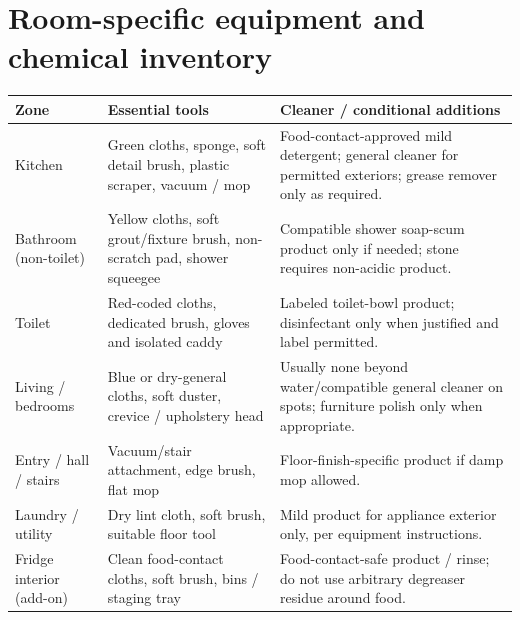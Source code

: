 \documentclass[10pt,letterpaper,oneside]{article}
\newcommand{\smalltable}{\par\small\renewcommand{\arraystretch}{1.24}}
\newcommand{\restorenormalfonttable}{\par\normalsize\renewcommand{\arraystretch}{1}}
\begin{document}
\section{Room-specific equipment and chemical inventory}
\smalltable\begin{longtable}{p{.18\linewidth}p{.37\linewidth}p{.36\linewidth}}\toprule
Zone & Essential tools & Cleaner / conditional additions\\\midrule\endhead
Kitchen & Green cloths, sponge, soft detail brush, plastic scraper, vacuum / mop & Food-contact-approved mild detergent; general cleaner for permitted exteriors; grease remover only as required.\\
Bathroom (non-toilet) & Yellow cloths, soft grout/fixture brush, non-scratch pad, shower squeegee & Compatible shower soap-scum product only if needed; stone requires non-acidic product.\\
Toilet & Red-coded cloths, dedicated brush, gloves and isolated caddy & Labeled toilet-bowl product; disinfectant only when justified and label permitted.\\
Living / bedrooms & Blue or dry-general cloths, soft duster, crevice / upholstery head & Usually none beyond water/compatible general cleaner on spots; furniture polish only when appropriate.\\
Entry / hall / stairs & Vacuum/stair attachment, edge brush, flat mop & Floor-finish-specific product if damp mop allowed.\\
Laundry / utility & Dry lint cloth, soft brush, suitable floor tool & Mild product for appliance exterior only, per equipment instructions.\\
Fridge interior (add-on) & Clean food-contact cloths, soft brush, bins / staging tray & Food-contact-safe product / rinse; do not use arbitrary degreaser residue around food.\\\bottomrule\end{longtable}\restorenormalfonttable
\end{document}
